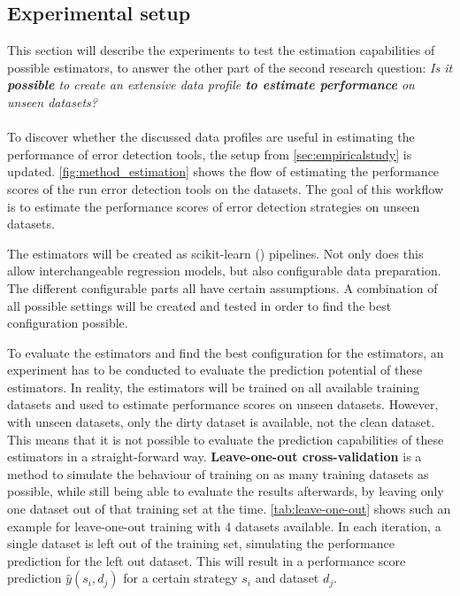 \subsection{Experimental setup}
This section will describe the experiments to test the estimation capabilities of possible estimators, to answer the other part of the second research question: \textit{Is it \textbf{possible} to create an extensive data profile \textbf{to estimate performance} on unseen datasets?}
~\\~\\To discover whether the discussed data profiles are useful in estimating the performance of error detection tools, the setup from \autoref{sec:empiricalstudy} is updated. \autoref{fig:method_estimation} shows the flow of estimating the performance scores of the run error detection tools on the datasets. The goal of this workflow is to estimate the performance scores of error detection strategies on unseen datasets.

The estimators will be created as scikit-learn (\cite{Pedregosa2011-su}) pipelines. Not only does this allow interchangeable regression models, but also configurable data preparation. The different configurable parts all have certain assumptions. A combination of all possible settings will be created and tested in order to find the best configuration possible.

To evaluate the estimators and find the best configuration for the estimators, an experiment has to be conducted to evaluate the prediction potential of these estimators.
In reality, the estimators will be trained on all available training datasets and used to estimate performance scores on unseen datasets. However, with unseen datasets, only the dirty dataset is available, not the clean dataset. This means that it is not possible to evaluate the prediction capabilities of these estimators in a straight-forward way.
\textbf{Leave-one-out cross-validation} is a method to simulate the behaviour of training on as many training datasets as possible, while still being able to evaluate the results afterwards, by leaving only one dataset out of that training set at the time. \autoref{tab:leave-one-out} shows such an example for leave-one-out training with 4 datasets available. In each iteration, a single dataset is left out of the training set, simulating the performance prediction for the left out dataset. This will result in a performance score prediction $\hat{y}(s_i, d_j)$ for a certain strategy $s_i$ and dataset $d_j$. 


